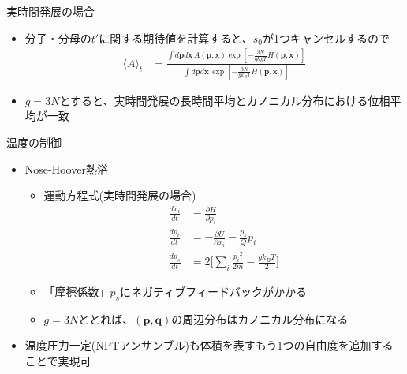 \begin{frame}[t,fragile]{実時間発展の場合}
  \begin{itemize}
  \item 分子・分母の$t'$に関する期待値を計算すると、$s_0$が1つキャンセルするので
    \begin{align*}
      \langle A \rangle_t &= \frac{\int d\mathbf{p} d\mathbf{x} \, A(\mathbf{p},\mathbf{x}) \exp [ -\frac{3N}{gk_BT} H(\mathbf{p}, \mathbf{x})]}{\int d\mathbf{p} d\mathbf{x} \, \exp [ -\frac{3N}{gk_BT} H(\mathbf{p}, \mathbf{x})]}
    \end{align*}
    \item {\color{red}$g=3N$}とすると、実時間発展の長時間平均とカノニカル分布における位相平均が一致
  \end{itemize}
\end{frame}

\begin{frame}[t,fragile]{温度の制御}
  \begin{itemize}
  \item Nose-Hoover熱浴
    \begin{itemize}
    \item 運動方程式(実時間発展の場合)
      \begin{align*}
        \frac{dx_i}{dt} &= \frac{\partial H}{\partial p_i} \\
        \frac{dp_i}{dt} &= -\frac{\partial U}{\partial x_i} -\frac{p_s}{Q} p_i \\
        \frac{dp_s}{dt} &= 2 \big[ \sum_i \frac{{p_i}^2}{2m} - \frac{g k_B T}{2} \big]
      \end{align*}
    \item 「摩擦係数」$p_s$にネガティブフィードバックがかかる
    \item $g=3N$ととれば、$(\mathbf{p},\mathbf{q})$の周辺分布はカノニカル分布になる
    \end{itemize}
    \item 温度圧力一定(NPTアンサンブル)も体積を表すもう1つの自由度を追加することで実現可
  \end{itemize}
\end{frame}


